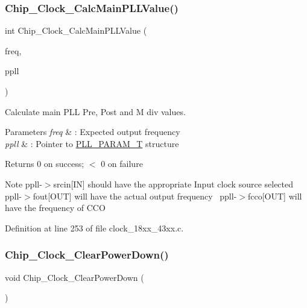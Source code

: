 \subsubsection{\texorpdfstring{Chip\+\_\+\+Clock\+\_\+\+Calc\+Main\+P\+L\+L\+Value()}{Chip\_Clock\_CalcMainPLLValue()}}
{\footnotesize\ttfamily int Chip\+\_\+\+Clock\+\_\+\+Calc\+Main\+P\+L\+L\+Value (\begin{DoxyParamCaption}\item[{uint32\+\_\+t}]{freq,  }\item[{\hyperlink{struct_p_l_l___p_a_r_a_m___t}{P\+L\+L\+\_\+\+P\+A\+R\+A\+M\+\_\+T} $\ast$}]{ppll }\end{DoxyParamCaption})}



Calculate main P\+LL Pre, Post and M div values. 


\begin{DoxyParams}{Parameters}
{\em freq} & \+: Expected output frequency \\
\hline
{\em ppll} & \+: Pointer to \hyperlink{struct_p_l_l___p_a_r_a_m___t}{P\+L\+L\+\_\+\+P\+A\+R\+A\+M\+\_\+T} structure \\
\hline
\end{DoxyParams}
\begin{DoxyReturn}{Returns}
0 on success; $<$ 0 on failure 
\end{DoxyReturn}
\begin{DoxyNote}{Note}
ppll-\/$>$srcin\mbox{[}IN\mbox{]} should have the appropriate Input clock source selected~\newline
 ppll-\/$>$fout\mbox{[}O\+UT\mbox{]} will have the actual output frequency~\newline
 ppll-\/$>$fcco\mbox{[}O\+UT\mbox{]} will have the frequency of C\+CO 
\end{DoxyNote}


Definition at line 253 of file clock\+\_\+18xx\+\_\+43xx.\+c.

\mbox{\label{group___c_l_o_c_k__18_x_x__43_x_x_ga28a09f033418df7c8588b073af5d6eac}} 
\subsubsection{\texorpdfstring{Chip\+\_\+\+Clock\+\_\+\+Clear\+Power\+Down()}{Chip\_Clock\_ClearPowerDown()}}
{\footnotesize\ttfamily void Chip\+\_\+\+Clock\+\_\+\+Clear\+Power\+Down (\begin{DoxyParamCaption}\item[{void}]{ }\end{DoxyParamCaption})}



